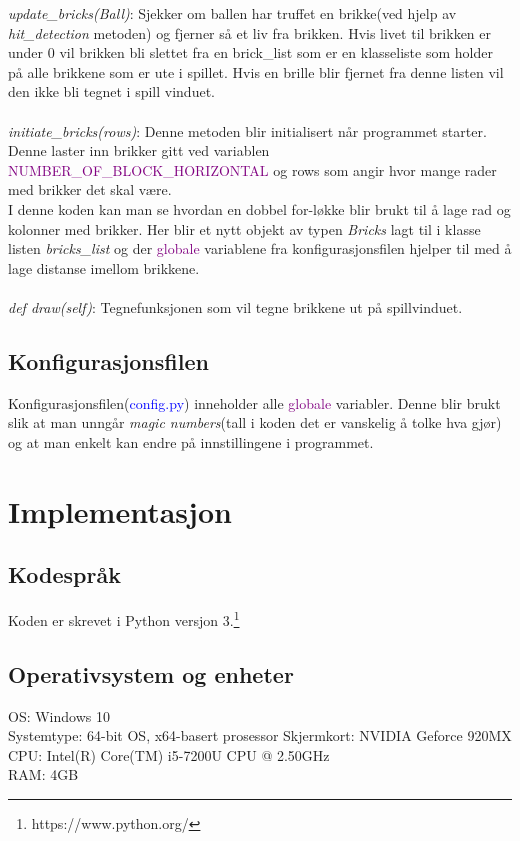 \documentclass{article}     %
\begin{document}
\emph{update\_bricks(Ball)}: Sjekker om ballen har truffet en brikke(ved hjelp av \emph{hit\_detection} metoden) og fjerner så et liv fra brikken. Hvis livet til brikken er under 0 vil brikken bli slettet fra en brick\_list som er en klasseliste som holder på alle brikkene som er ute i spillet. Hvis en brille blir fjernet fra denne listen vil den ikke bli tegnet i spill vinduet.\\\\


\emph{initiate\_bricks(rows)}: Denne metoden blir initialisert når programmet starter. Denne laster inn brikker gitt ved variablen \textcolor{purple}{NUMBER\_OF\_BLOCK\_HORIZONTAL} og rows som angir hvor mange rader med brikker det skal være.\\

I denne koden kan man se hvordan en dobbel for-løkke blir brukt til å lage rad og kolonner med brikker. Her blir et nytt objekt av typen \emph{Bricks} lagt til i klasse listen \emph{bricks\_list} og der \textcolor{purple}{globale} variablene fra konfigurasjonsfilen hjelper til med å lage distanse imellom brikkene.\\\\

\emph{def draw(self)}: Tegnefunksjonen som vil tegne brikkene ut på spillvinduet.




\subsection{Konfigurasjonsfilen}

Konfigurasjonsfilen(\textcolor{blue}{config.py}) inneholder alle \textcolor{purple}{globale} variabler. Denne blir brukt slik at man unngår \emph{magic numbers}(tall i koden det er vanskelig å tolke hva gjør) og at man enkelt kan endre på innstillingene i programmet.



\section{Implementasjon}
\subsection{Kodespråk}
Koden er skrevet i Python versjon 3.\footnote{https://www.python.org/}\\
\subsection{Operativsystem og enheter}
OS: Windows 10\\
Systemtype: 64-bit OS, x64-basert prosessor
Skjermkort: NVIDIA Geforce 920MX\\
CPU: Intel(R) Core(TM) i5-7200U CPU @ 2.50GHz\\
RAM: 4GB
\end{document}
